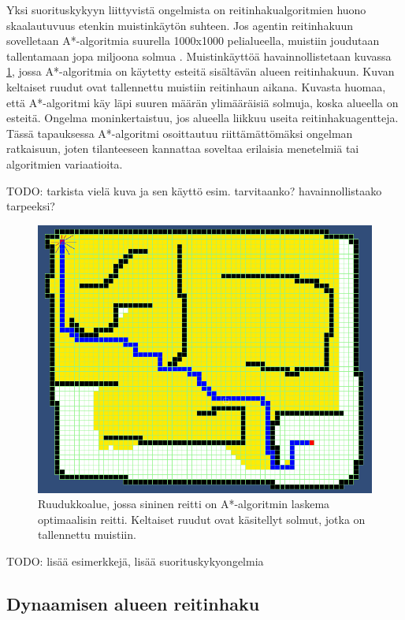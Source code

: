 \documentclass[utf8]{gradu3}
\begin{document}
Yksi suorituskykyyn liittyvistä ongelmista on reitinhakualgoritmien huono skaalautuvuus etenkin muistinkäytön suhteen. Jos agentin reitinhakuun sovelletaan A*-algoritmia suurella 1000x1000 pelialueella, muistiin joudutaan tallentamaan jopa miljoona solmua \parencite{cui2011based,duchovn2014path}. Muistinkäyttöä havainnollistetaan kuvassa \ref{astarmemory}, jossa A*-algoritmia on käytetty esteitä sisältävän alueen reitinhakuun. Kuvan keltaiset ruudut ovat tallennettu muistiin reitinhaun aikana. Kuvasta huomaa, että A*-algoritmi käy läpi suuren määrän ylimääräisiä solmuja, koska alueella on esteitä. Ongelma moninkertaistuu, jos alueella liikkuu useita reitinhakuagentteja. Tässä tapauksessa A*-algoritmi osoittautuu riittämättömäksi ongelman ratkaisuun, joten tilanteeseen kannattaa soveltaa erilaisia menetelmiä tai algoritmien variaatioita.

TODO: tarkista vielä kuva ja sen käyttö esim. tarvitaanko? havainnollistaako tarpeeksi?

\begin{figure}[h]
\centering
\includegraphics[width=15cm]{a_star_memory.png}
\caption{Ruudukkoalue, jossa sininen reitti on A*-algoritmin laskema optimaalisin reitti. Keltaiset ruudut ovat käsitellyt solmut, jotka on tallennettu muistiin.}
\label{astarmemory}
\end{figure}

TODO: lisää esimerkkejä, lisää suorituskykyongelmia

\subsection{Dynaamisen alueen reitinhaku}
\end{document}
